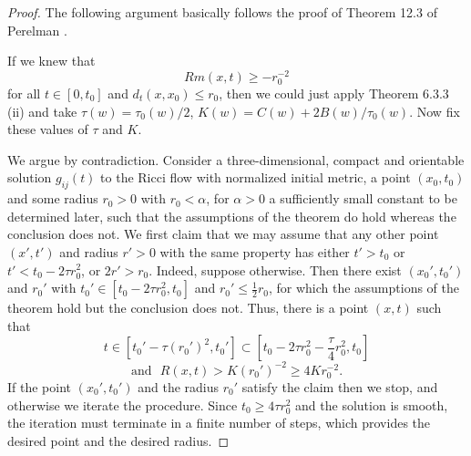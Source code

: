 \begin{proof}
   The following argument basically follows
the proof of Theorem 12.3 of Perelman \cite{P1}.

 If we knew that
$$
Rm(x,t)\geq-r_0^{-2}
$$
for all $t\in[0,t_0]$ and $d_t(x,x_0)\leq r_0$, then we could just
apply Theorem 6.3.3 (ii) and take $\tau(w)=\tau_0(w)/2$,
$K(w)=C(w)+2B(w)/\tau_0(w)$. Now fix these values of $\tau$ and
$K$.

We argue by contradiction. Consider a three-dimensional, compact
and orientable solution $g_{ij}(t)$ to the Ricci flow with
normalized initial metric, a point $(x_0,t_0)$ and some radius
$r_0>0$ with $r_0<\alpha$, for $\alpha>0$ a sufficiently small
constant to be determined later, such that the assumptions of the
theorem do hold whereas the conclusion does not. We first claim
that we may assume that any other point $(x',t')$ and radius
$r'>0$ with the same property has either $t'>t_0$ or $t'<t_0-2\tau
r_0^2$, or $2r'>r_0$. Indeed, suppose otherwise. Then there exist
$(x_0',t_0')$ and $r_0'$ with $t_0'\in[t_0-2\tau r_0^2,t_0]$ and
$r_0'\leq\frac{1}{2}r_0$, for which the assumptions of the theorem
hold but the conclusion does not. Thus, there is a point $(x,t)$
such that
$$
t\in[t_0'-\tau(r_0')^2,t_0']\subset\left[t_0-2\tau
r^2_0-\frac{\tau}{4}r_0^2,t_0\right]
$$
$$
\mbox{and}\ \ \ R(x,t)> K(r_0')^{-2}\geq4Kr_0^{-2}.
$$
If the point $(x_0',t_0')$ and the radius $r_0'$ satisfy the claim
then we stop, and otherwise we iterate the procedure. Since
$t_0\geq4\tau r^2_0$ and the solution is smooth, the iteration
must terminate in a finite number of steps, which provides the
desired point and the desired radius.


\end{proof}

